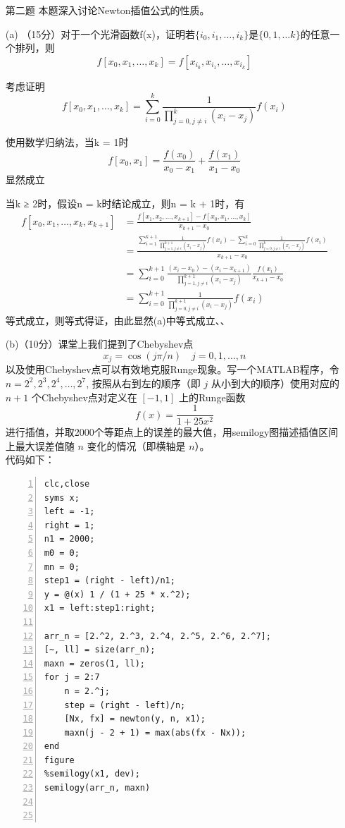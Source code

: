 \documentclass[12pt,a4paper,UTF8]{ctexart}
\begin{document}
\begin{enumerate}
	\item[第二题]
	本题深入讨论Newton插值公式的性质。

	(a) （15分）对于一个光滑函数f(x)，证明若$\{i_0, i_1, \dots, i_k\}$是$\{0, 1, \dots k\}$的任意一个排列，则
	$$
		f[x_0,x_1,\dots,x_k]=f[x_{i_0},x_{i_1},\dots,x_{i_k}]
	$$

	考虑证明
	$$
		f[x_0,x_1,\dots,x_k] = \sum_{i=0}^k {\frac {1} {\prod_{j = 0,j\ne i}^k {(x_i-x_j)}} f(x_i)}
	$$

	使用数学归纳法，当k = 1时
	$$
	f[x_0,x_1] = \frac {f(x_0)}{x_0-x_1}+\frac {f(x_1)} {x_1-x_0}
	$$
	显然成立

	当k ≥ 2时，假设n = k时结论成立，则n = k + 1时，有
	$$
	\begin{aligned}
		f[x_0,x_1,\dots,x_k,x_{k+1}] &=\frac {f[x_1,x_2,\dots,x_{k+1}]-f[x_0,x_1,\dots,x_k]}{x_{k+1}-x_0}\\
		&=\frac{\sum_{i=1}^{k+1} {\frac {1} {\prod_{j = 1,j\ne i}^{k+1} {(x_i-x_j)}} f(x_i)}-\sum_{i=0}^k {\frac {1} {\prod_{j = 0,j\ne i}^k {(x_i-x_j)}} f(x_i)}}{x_{k+1}-x_0}\\
		&=\sum_{i=0}^{k+1} {\frac{(x_i-x_0)-(x_i-x_{k+1})} {\prod_{j = 1,j\ne i}^{k+1} {(x_i-x_j)}} \frac {f(x_i)}{x_{k+1}-x_0}}\\
		&=	\sum_{i=0}^{k+1} {\frac {1} {\prod_{j = 0,j\ne i}^{k+1} {(x_i-x_j)}} f(x_i)}
	\end{aligned}
	$$
	等式成立，则等式得证，由此显然(a)中等式成立、、

	(b)（10分）课堂上我们提到了Chebyshev点
    $$ x_{j}=\cos (j \pi / n) \quad j=0,1, \ldots, n$$
    以及使用Chebyshev点可以有效地克服Runge现象。写一个MATLAB程序，令 $n=2^{2}, 2^{3}, 2^{4}, \ldots, 2^{7}$, 按照从右到左的顺序（即 $j$ 从小到大的顺序）使用对应的 $n+1$ 个Chebyshev点对定义在 $[-1,1]$ 上的Runge函数$$ f(x)=\frac{1}{1+25 x^{2}}$$进行插值，并取2000个等距点上的误差的最大值，用semilogy图描述插值区间上最大误差值随 $n$ 变化的情况（即横轴是 $n$）。\\
	
	代码如下：\\

\begin{lstlisting}[frame=single,numbers=left]
clc,close
syms x;
left = -1;
right = 1;
n1 = 2000;
m0 = 0;
mn = 0;
step1 = (right - left)/n1;
y = @(x) 1 / (1 + 25 * x.^2);
x1 = left:step1:right;

arr_n = [2.^2, 2.^3, 2.^4, 2.^5, 2.^6, 2.^7];
[~, ll] = size(arr_n);
maxn = zeros(1, ll);
for j = 2:7
    n = 2.^j;
    step = (right - left)/n;
    [Nx, fx] = newton(y, n, x1);
    maxn(j - 2 + 1) = max(abs(fx - Nx));
end
figure
%semilogy(x1, dev);
semilogy(arr_n, maxn)



\end{lstlisting}
\end{enumerate}
\end{document}
